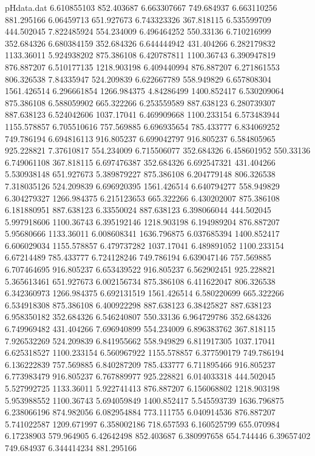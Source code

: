 \begin{filecontents}{pHdata.dat}
6.610855103	852.403687
6.663307667	749.684937
6.663110256	881.295166
6.06459713	651.927673
6.743323326	367.818115
6.535599709	444.502045
7.822485924	554.234009
6.496464252	550.33136
6.710216999	352.684326
6.680384159	352.684326
6.644444942	431.404266
6.282179832	1133.36011
5.924938202	875.386108
6.420787811	1100.36743
6.390947819	876.887207
6.510177135	1218.903198
6.409440994	876.887207
6.271861553	806.326538
7.84335947	524.209839
6.622667789	558.949829
6.657808304	1561.426514
6.296661854	1266.984375
4.84286499	1400.852417
6.530209064	875.386108
6.588059902	665.322266
6.253559589	887.638123
6.280739307	887.638123
6.524042606	1037.17041
6.469909668	1100.233154
6.573483944	1155.578857
6.705510616	757.569885
6.696935654	785.433777
6.834069252	749.786194
6.694816113	916.805237
6.699042797	916.805237
6.584805965	925.228821
7.37610817	554.234009
6.715506077	352.684326
6.458601952	550.33136
6.749061108	367.818115
6.697476387	352.684326
6.692547321	431.404266
5.530938148	651.927673
5.389879227	875.386108
6.204779148	806.326538
7.318035126	524.209839
6.696920395	1561.426514
6.640794277	558.949829
6.304279327	1266.984375
6.215123653	665.322266
6.430202007	875.386108
6.181880951	887.638123
6.33550024	887.638123
6.398066044	444.502045
5.997918606	1100.36743
6.395192146	1218.903198
6.194989204	876.887207
5.95680666	1133.36011
6.008608341	1636.796875
6.037685394	1400.852417
6.606029034	1155.578857
6.479737282	1037.17041
6.489891052	1100.233154
6.67214489	785.433777
6.724128246	749.786194
6.639047146	757.569885
6.707464695	916.805237
6.653439522	916.805237
6.562902451	925.228821
5.365613461	651.927673
6.002156734	875.386108
6.411622047	806.326538
6.342360973	1266.984375
6.692131519	1561.426514
6.580220699	665.322266
6.534918308	875.386108
6.400922298	887.638123
6.38425827	887.638123
6.958350182	352.684326
6.546240807	550.33136
6.964729786	352.684326
6.749969482	431.404266
7.696940899	554.234009
6.896383762	367.818115
7.926532269	524.209839
6.841955662	558.949829
6.811917305	1037.17041
6.625318527	1100.233154
6.560967922	1155.578857
6.377590179	749.786194
6.136222839	757.569885
6.840287209	785.433777
6.711895466	916.805237
6.773983479	916.805237
6.767889977	925.228821
6.014033318	444.502045
5.527992725	1133.36011
5.922741413	876.887207
6.156068802	1218.903198
5.953988552	1100.36743
5.694059849	1400.852417
5.545593739	1636.796875
6.238066196	874.982056
6.082954884	773.111755
6.040914536	876.887207
5.741022587	1209.671997
6.358002186	718.657593
6.160525799	655.070984
6.17238903	579.964905
6.42642498	852.403687
6.380997658	654.744446
6.39657402	749.684937
6.344414234	881.295166

\end{filecontents}
